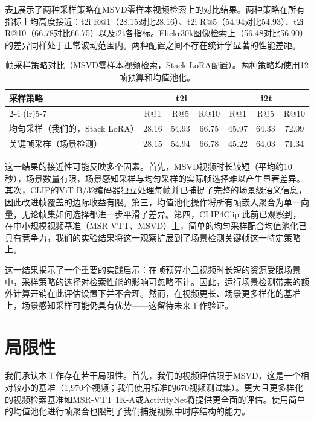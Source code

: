 \documentclass[10pt,a4paper]{ctexart}
\begin{document}
表\ref{tab:sampling}展示了两种采样策略在MSVD零样本视频检索上的对比结果。两种策略在所有指标上均高度接近：t2i R@1（28.15对比28.16）、t2i R@5（54.94对比54.93）、t2i R@10（66.78对比66.75）以及i2t各指标。Flickr30k图像检索上（56.48对比56.90）的差异同样处于正常波动范围内。两种配置之间不存在统计学显著的性能差距。

\begin{table}[h]
\centering
\caption{帧采样策略对比（MSVD零样本视频检索，Stack LoRA配置）。两种策略均使用12帧预算和均值池化。}
\label{tab:sampling}
\begin{tabular}{lcccccc}
\toprule
采样策略 & \multicolumn{3}{c}{t2i} & \multicolumn{3}{c}{i2t} \\
\cmidrule(lr){2-4} \cmidrule(lr){5-7}
 & R@1 & R@5 & R@10 & R@1 & R@5 & R@10 \\
\midrule
均匀采样（我们的，Stack LoRA） & 28.16 & 54.93 & 66.75 & 45.97 & 64.33 & 72.09 \\
关键帧采样（场景检测） & 28.15 & 54.94 & 66.78 & 45.22 & 64.03 & 71.34 \\
\bottomrule
\end{tabular}
\end{table}

这一结果的接近性可能反映多个因素。首先，MSVD视频时长较短（平均约10秒），场景数量有限，场景感知采样与均匀采样的实际帧选择难以产生显著差异。其次，CLIP的ViT-B/32编码器独立处理每帧并已捕捉了完整的场景级语义信息，因此改进帧覆盖的边际收益有限。第三，均值池化操作将所有帧嵌入聚合为单一向量，无论帧集如何选择都进一步平滑了差异。第四，CLIP4Clip \citep{luo2022clip4clip}此前已观察到，在中小规模视频基准（MSR-VTT、MSVD）上，简单的均匀采样配合均值池化已具有竞争力，我们的实验结果将这一观察扩展到了场景检测关键帧这一特定策略上。

这一结果揭示了一个重要的实践启示：在帧预算小且视频时长短的资源受限场景中，采样策略的选择对检索性能的影响可忽略不计。因此，运行场景检测带来的额外计算开销在此评估设置下并不合理。然而，在视频更长、场景更多样化的基准上，场景感知采样可能仍具有优势——这留待未来工作验证。

\section{局限性}

我们承认本工作存在若干局限性。首先，我们的视频评估限于MSVD，这是一个相对较小的基准（1,970个视频；我们使用标准的670视频测试集）。更大且更多样化的视频检索基准如MSR-VTT 1K-A或ActivityNet将提供更全面的评估。使用简单的均值池化进行帧聚合也限制了我们捕捉视频中时序结构的能力。
\end{document}
